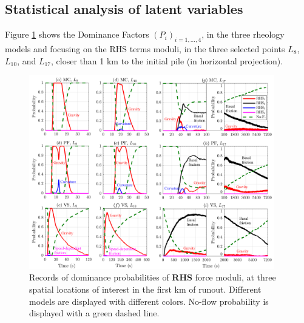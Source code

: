 \documentclass{article}
\begin{document}
\subsection{Statistical analysis of latent variables}\label{Hq2}
Figure \ref{fig:Colima-Pr1} shows the Dominance Factors $(P_i)_{i=1,\dots,4}$, in the three rheology models and focusing on the RHS terms moduli, in the three selected points $L_{8}$, $L_{10}$, and $L_{17}$, closer than 1 km to the initial pile (in horizontal projection). 
\begin{figure}[H]
         \centering
        \includegraphics[width=0.95\textwidth]{BAF_VolcanDeColima/ForceContrib/Pr1_total.png}
        \caption{Records of dominance probabilities of \textbf{RHS} force moduli, at three spatial locations of interest in the first km of runout. Different models are displayed with different colors. No-flow probability is displayed with a green dashed line.}
        \label{fig:Colima-Pr1}
\end{figure}
\end{document}
